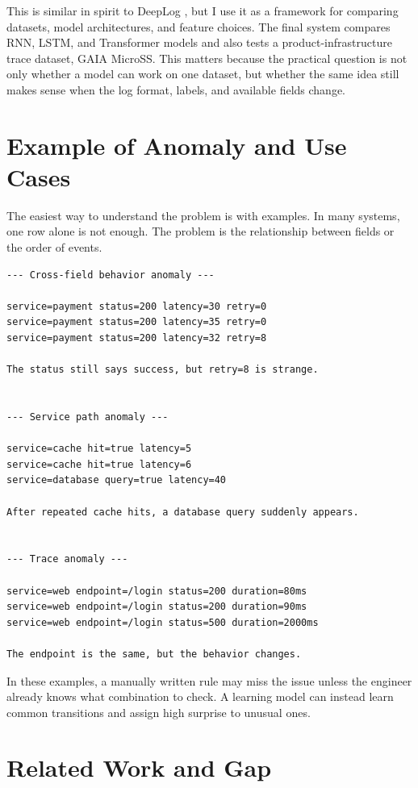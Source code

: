\documentclass[11pt]{article}
\begin{document}
This is similar in spirit to DeepLog \cite{du2017deeplog}, but I use it as a framework for comparing datasets, model architectures, and feature choices. The final system compares RNN, LSTM, and Transformer models and also tests a product-infrastructure trace dataset, GAIA MicroSS. This matters because the practical question is not only whether a model can work on one dataset, but whether the same idea still makes sense when the log format, labels, and available fields change.

\section{Example of Anomaly and Use Cases}

The easiest way to understand the problem is with examples. In many systems, one row alone is not enough. The problem is the relationship between fields or the order of events.

\begin{lstlisting}[caption={Example transition anomalies in key-value style logs}]
--- Cross-field behavior anomaly ---

service=payment status=200 latency=30 retry=0
service=payment status=200 latency=35 retry=0
service=payment status=200 latency=32 retry=8

The status still says success, but retry=8 is strange.


--- Service path anomaly ---

service=cache hit=true latency=5
service=cache hit=true latency=6
service=database query=true latency=40

After repeated cache hits, a database query suddenly appears.


--- Trace anomaly ---

service=web endpoint=/login status=200 duration=80ms
service=web endpoint=/login status=200 duration=90ms
service=web endpoint=/login status=500 duration=2000ms

The endpoint is the same, but the behavior changes.
\end{lstlisting}

In these examples, a manually written rule may miss the issue unless the engineer already knows what combination to check. A learning model can instead learn common transitions and assign high surprise to unusual ones.

\section{Related Work and Gap}
\end{document}
